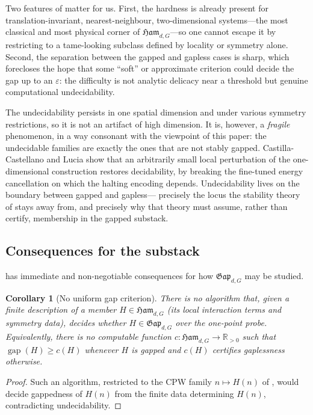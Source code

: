 \documentclass[12pt]{article}
\newcommand{\Ham}{\mathfrak{Ham}}              %
\newcommand{\Gap}{\mathfrak{Gap}}              %
\newcommand{\gapof}[1]{\operatorname{gap}(#1)} %
\newcommand{\R}{\mathbb{R}}
\theoremstyle{plain}
\newtheorem{corollary}[corollary]{Corollary}
\theoremstyle{definition}
\theoremstyle{remark}
\begin{document}
Two features of  matter for us. First, the hardness is already present
for translation-invariant, nearest-neighbour, two-dimensional systems---the most
classical and most physical corner of $\Ham_{d,G}$---so one cannot escape it by
restricting to a tame-looking subclass defined by locality or symmetry alone. Second,
the separation between the gapped and gapless cases is sharp, which forecloses the
hope that some ``soft'' or approximate criterion could decide the gap up to an
$\varepsilon$: the difficulty is not analytic delicacy near a threshold but genuine
computational undecidability.

The undecidability persists in one spatial dimension \cite{bcl-pg-1d-undecidable} and
under various symmetry restrictions, so it is not an artifact of high dimension. It
is, however, a \emph{fragile} phenomenon, in a way consonant with the viewpoint of
this paper: the undecidable families are exactly the ones that are not stably gapped.
Castilla-Castellano and Lucia \cite{castilla-lucia-instability} show that an
arbitrarily small local perturbation of the one-dimensional construction restores
decidability, by breaking the fine-tuned energy cancellation on which the halting
encoding depends. Undecidability lives on the boundary between gapped and gapless---%
precisely the locus the stability theory of  stays away from, and
precisely why that theory must assume, rather than certify, membership in the gapped
substack.

\subsection{Consequences for the substack}
\label{sec:wall-consequences}

 has immediate and non-negotiable consequences for how $\Gap_{d,G}$ may
be studied.

\begin{corollary}[No uniform gap criterion]
\label{cor:no-criterion}
There is no algorithm that, given a finite description of a member
$H\in\Ham_{d,G}$ (its local interaction terms and symmetry data), decides whether
$H\in\Gap_{d,G}$ over the one-point probe. Equivalently, there is no computable
function $c:\Ham_{d,G}\to\R_{>0}$ such that $\gapof{H}\ge c(H)$ whenever $H$ is
gapped and $c(H)$ certifies gaplessness otherwise.
\end{corollary}

\begin{proof}
Such an algorithm, restricted to the CPW family $n\mapsto H(n)$ of ,
would decide gappedness of $H(n)$ from the finite data determining $H(n)$,
contradicting undecidability.
\end{proof}
\end{document}
